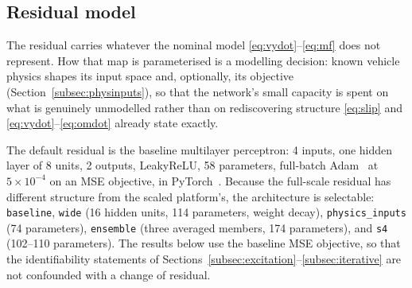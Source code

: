 \subsection{Residual model}
\label{subsec:residual}

The residual carries whatever the nominal model
\eqref{eq:vydot}--\eqref{eq:mf} does not represent. How that map is
parameterised is a modelling decision: known vehicle physics shapes its input
space and, optionally, its objective (Section~\ref{subsec:physinputs}), so that
the network's small capacity is spent on what is genuinely unmodelled rather
than on rediscovering structure \eqref{eq:slip} and
\eqref{eq:vydot}--\eqref{eq:omdot} already state exactly.

The default residual is the baseline multilayer perceptron: 4 inputs, one
hidden layer of 8 units, 2 outputs, LeakyReLU, 58 parameters, full-batch
Adam~\cite{kingma2015adam} at $5\times10^{-4}$ on an MSE objective, in
PyTorch~\cite{paszke2019pytorch}. Because the full-scale residual has different
structure from the scaled platform's, the architecture is selectable:
\texttt{baseline}, \texttt{wide} (16 hidden units, 114 parameters, weight
decay), \texttt{physics\_inputs} (74 parameters), \texttt{ensemble} (three
averaged members, 174 parameters), and \texttt{s4} (\numrange{102}{110}
parameters). The results below use the baseline MSE objective, so that the
identifiability statements of
Sections~\ref{subsec:excitation}--\ref{subsec:iterative} are not confounded
with a change of residual.

